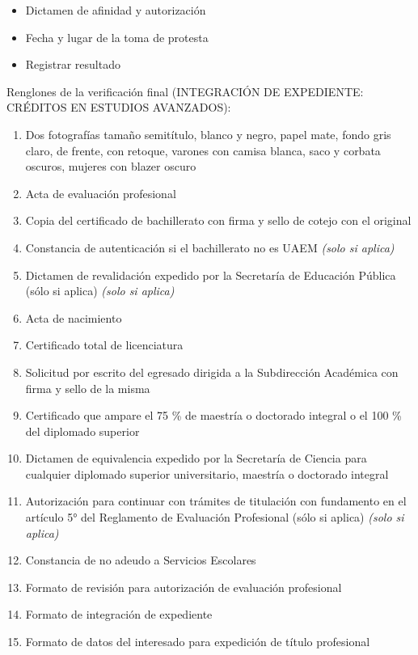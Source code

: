 \begin{itemize}
  \item Dictamen de afinidad y autorización
  \item Fecha y lugar de la toma de protesta
  \item Registrar resultado
\end{itemize}
Renglones de la verificación final (INTEGRACIÓN DE EXPEDIENTE: CRÉDITOS EN ESTUDIOS AVANZADOS):
\begin{enumerate}
  \item Dos fotografías tamaño semitítulo, blanco y negro, papel mate, fondo gris claro, de frente, con retoque, varones con camisa blanca, saco y corbata oscuros, mujeres con blazer oscuro
  \item Acta de evaluación profesional
  \item Copia del certificado de bachillerato con firma y sello de cotejo con el original
  \item Constancia de autenticación si el bachillerato no es UAEM \emph{(solo si aplica)}
  \item Dictamen de revalidación expedido por la Secretaría de Educación Pública (sólo si aplica) \emph{(solo si aplica)}
  \item Acta de nacimiento
  \item Certificado total de licenciatura
  \item Solicitud por escrito del egresado dirigida a la Subdirección Académica con firma y sello de la misma
  \item Certificado que ampare el 75 \% de maestría o doctorado integral o el 100 \% del diplomado superior
  \item Dictamen de equivalencia expedido por la Secretaría de Ciencia para cualquier diplomado superior universitario, maestría o doctorado integral
  \item Autorización para continuar con trámites de titulación con fundamento en el artículo 5° del Reglamento de Evaluación Profesional (sólo si aplica) \emph{(solo si aplica)}
  \item Constancia de no adeudo a Servicios Escolares
  \item Formato de revisión para autorización de evaluación profesional
  \item Formato de integración de expediente
  \item Formato de datos del interesado para expedición de título profesional
\end{enumerate}

